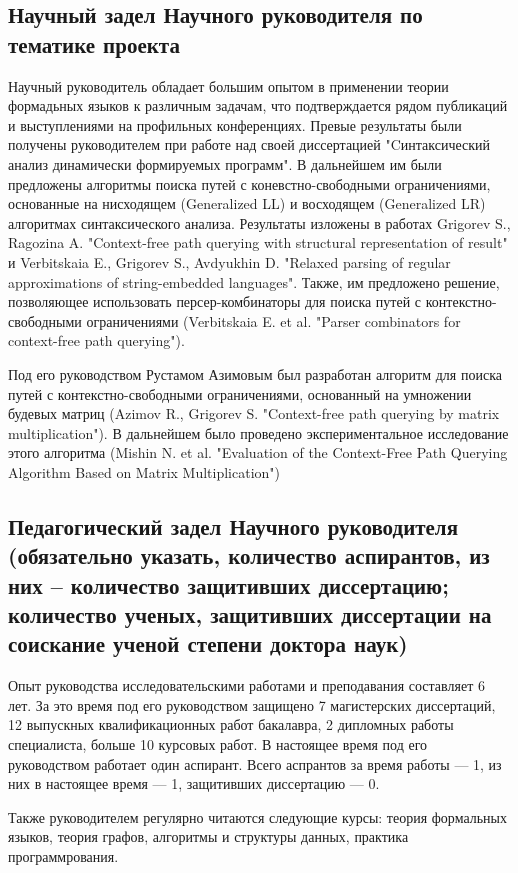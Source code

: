 \documentclass[12pt]{article}  %
\theoremstyle{remark}
\begin{document}
\subsection{Научный задел Научного руководителя по тематике проекта}
Научный руководитель обладает большим опытом в применении теории формадьных языков к различным задачам, что подтверждается рядом публикаций и выступлениями на профильных конференциях.
Превые результаты были получены руководителем при работе над своей диссертацией "Cинтаксический анализ динамически формируемых программ". В дальнейшем им были предложены алгоритмы поиска путей с коневстно-свободными ограничениями, основанные на нисходящем (Generalized LL) и восходящем (Generalized LR) алгоритмах синтаксического анализа. Результаты изложены в работах Grigorev S., Ragozina A. "Context-free path querying with structural representation of result" и Verbitskaia E., Grigorev S., Avdyukhin D. "Relaxed parsing of regular approximations of string-embedded languages". Также, им предложено решение, позволяющее использовать персер-комбинаторы для поиска путей с контекстно-свободными ограничениями (Verbitskaia E. et al. "Parser combinators for context-free path querying").

Под его руководством Рустамом Азимовым был разработан алгоритм для поиска путей с контекстно-свободными ограничениями, основанный на умножении будевых матриц (Azimov R., Grigorev S. "Context-free path querying by matrix multiplication"). В дальнейшем было проведено экспериментальное исследование этого алгоритма (Mishin N. et al. "Evaluation of the Context-Free Path Querying Algorithm Based on Matrix Multiplication")

\subsection{Педагогический задел Научного руководителя (обязательно указать, количество аспирантов, из них – количество защитивших диссертацию; количество ученых, защитивших диссертации на соискание ученой степени доктора наук)}
Опыт руководства исследовательскими работами и преподавания составляет 6 лет.
За это время под его руководством защищено 7 магистерских диссертаций, 12 выпускных квалификационных работ бакалавра, 2 дипломных работы специалиста, больше 10 курсовых работ. В настоящее время под его руководством работает один аспирант. Всего аспрантов за время работы --- 1, из них в настоящее время --- 1, защитивших диссертацию --- 0.

Также руководителем регулярно читаются следующие курсы: теория формальных языков, теория графов, алгоритмы и структуры данных, практика программрования.
\end{document}
